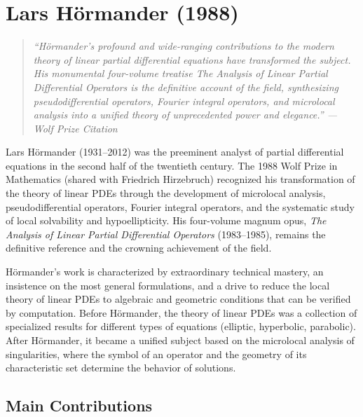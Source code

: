 \let\R\relax
\newcommand{\R}{\mathbb{R}}
\let\C\relax
\newcommand{\C}{\mathbb{C}}
\let\N\relax
\newcommand{\N}{\mathbb{N}}
\let\Z\relax
\newcommand{\Z}{\mathbb{Z}}
\let\WF\relax
\newcommand{\WF}{\operatorname{WF}}
\let\singsupp\relax
\newcommand{\singsupp}{\operatorname{singsupp}}

\chapter{Lars H\"{o}rmander (1988)}

\begin{quote}
\it ``H\"ormander's profound and wide-ranging contributions to the modern
theory of linear partial differential equations have transformed the
subject. His monumental four-volume treatise \textit{The Analysis of Linear
Partial Differential Operators} is the definitive account of the field,
synthesizing pseudodifferential operators, Fourier integral operators,
and microlocal analysis into a unified theory of unprecedented power and
elegance.'' --- Wolf Prize Citation
\end{quote}

Lars H\"ormander (1931--2012) was the preeminent analyst of partial
differential equations in the second half of the twentieth century. The
1988 Wolf Prize in Mathematics (shared with Friedrich Hirzebruch)
recognized his transformation of the theory of linear PDEs through the
development of microlocal analysis, pseudodifferential operators,
Fourier integral operators, and the systematic study of local solvability
and hypoellipticity. His four-volume magnum opus, \textit{The Analysis of
Linear Partial Differential Operators} (1983--1985), remains the
definitive reference and the crowning achievement of the field.

H\"ormander's work is characterized by extraordinary technical mastery,
an insistence on the most general formulations, and a drive to reduce
the local theory of linear PDEs to algebraic and geometric conditions
that can be verified by computation. Before H\"ormander, the theory of
linear PDEs was a collection of specialized results for different types
of equations (elliptic, hyperbolic, parabolic). After H\"ormander, it
became a unified subject based on the microlocal analysis of singularities,
where the symbol of an operator and the geometry of its characteristic
set determine the behavior of solutions.

\section{Main Contributions}

